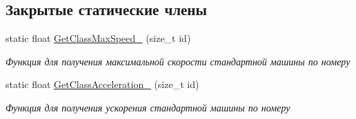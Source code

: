 \subsection*{Закрытые статические члены}
\begin{DoxyCompactItemize}
\item 
static float \hyperlink{classrtm_1_1_car_object_a0e69f04edd9f51f57a1d0fd39e2b0976}{Get\+Class\+Max\+Speed\+\_\+} (size\+\_\+t id)
\begin{DoxyCompactList}\small\item\em Функция для получения максимальной скорости стандартной машины по номеру \end{DoxyCompactList}\item 
static float \hyperlink{classrtm_1_1_car_object_a45d798bf2079173c677358b4b54d4e2b}{Get\+Class\+Acceleration\+\_\+} (size\+\_\+t id)
\begin{DoxyCompactList}\small\item\em Функция для получения ускорения стандартной машины по номеру \end{DoxyCompactList}\end{DoxyCompactItemize}
